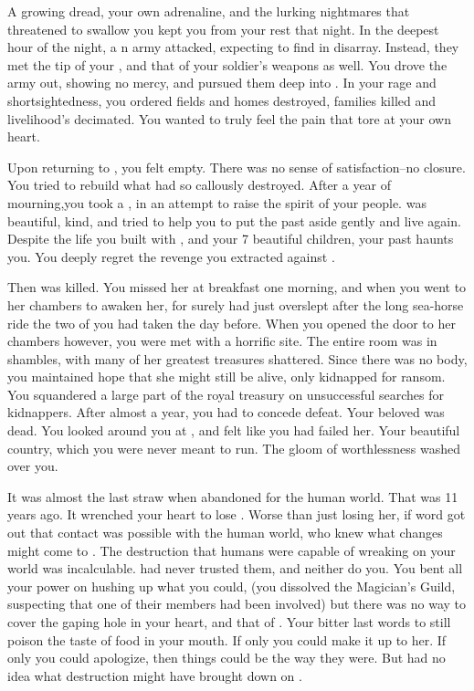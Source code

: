 \documentclass[char]{NeptuneBall}
\begin{document}
A growing dread, your own adrenaline, and the lurking nightmares that threatened to swallow you kept you from your rest that night. In the deepest hour of the night, a \pPacifica{}n army attacked, expecting to find \pAtlantis{} in disarray. Instead, they met the tip of your \iTriton{\MYname{}}, and that of your soldier's weapons as well. You drove the army out, showing no mercy, and pursued them deep into \pPacifica{}. In your rage and shortsightedness, you ordered fields and homes destroyed, families killed and livelihood's decimated. You wanted \pPacifica{} to truly feel the pain that tore at your own heart.

Upon returning to \pAtlantis{}, you felt empty. There was no sense of satisfaction--no closure. You tried to rebuild what \pPacifica{} had so callously destroyed. After a year of mourning,you took a \cQueen{\spouse{}}, \cQueen{\King{}} \cQueen{} in an attempt to raise the spirit of your people. \cQueen{\They{}} was beautiful, kind, and tried to help you to put the past aside gently and live again. Despite the life you built with \cQueen{}, and your 7 beautiful children, your past haunts you. You deeply regret the revenge you extracted against \pPacifica{}. 

Then \cQueen{} was killed. You missed her at breakfast one morning, and when you went to her chambers to awaken her, for surely \cQueen{\they} had just overslept after the long sea-horse ride the two of you had taken the day before. When you opened the door to her chambers however, you were met with a horrific site. The entire room was in shambles, with many of her greatest treasures shattered. Since there was no body, you maintained hope that she might still be alive, only kidnapped for ransom. You squandered a large part of the royal treasury on unsuccessful searches for \cQueen{\them{}} kidnappers. After almost a year, you had to concede defeat. Your beloved \cQueen{} was dead. You looked around you at \pAtlantis{}, and felt like you had failed her. Your beautiful country, which you were never meant to run. The gloom of worthlessness washed over you.

It was almost the last straw when \cAriel{\Prince} \cAriel{} abandoned \pAtlantis{} for the human world. That was 11 years ago.  It wrenched your heart to lose \cAriel{\them{}}. Worse than just losing her, if word got out that contact was possible with the human world, who knew what changes might come to \pAtlantis{}. The destruction that humans were capable of wreaking on your world was incalculable. \cExKing{\King} \cExKing{} had never trusted them, and neither do you. You bent all your power on hushing up what you could, (you dissolved the Magician's Guild, suspecting that one of their members had been involved) but there was no way to cover the gaping hole in your heart, and that of \pAtlantis{}. Your bitter last words to \cAriel{\Prince{}} \cAriel{\MYname{}} still poison the taste of food in your mouth. If only you could make it up to her. If only you could apologize, then things could be the way they were. But \cAriel{\they{}} had no idea what destruction \cAriel{\they{}} might have brought down on \pAtlantis{}.
\end{document}
